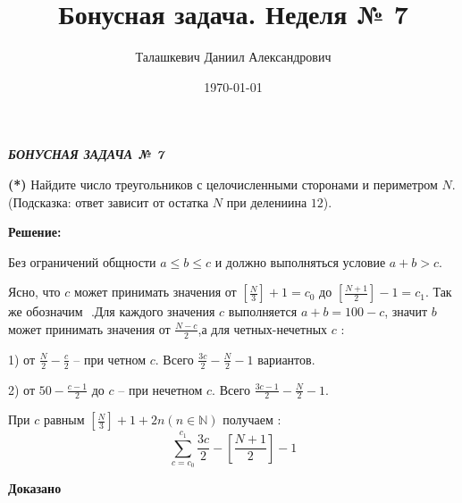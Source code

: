 \documentclass[a4paper,12pt]{article} %
\author{Талашкевич Даниил Александрович}
\title{Бонусная задача. Неделя № 7}
\date{\today}
\begin{document}
\maketitle
\thispagestyle{empty}

\newpage
\setcounter{page}{1}
\begin{center}
\itshape
\bfseries
{ \Large БОНУСНАЯ ЗАДАЧА № 	7}
\end{center}

{\bf (*) } Найдите число треугольников с целочисленными сторонами и периметром $N$. (Подсказка: ответ зависит от остатка $N$ при делениина $12$).
\begin{center}
\bfseries
{\Large Решение: }
\end{center}

Без ограничений общности $a\leqslant b \leqslant c$ и должно выполняться условие $a+b > c$.

Ясно, что $c$ может принимать значения от $\left[ \frac{N}{3}\right] + 1= c_0$ до $\left[ \frac{N+1}{2}\right]  - 1 = c_1$. Так же обозначим $ $ .Для каждого значения $c$ выполняется $a+b = 100 - c$, значит $b$ может принимать значения от $\frac{N - c}{2}$,а для четных-нечетных $c$ :

1) от $\frac{N}{2} - \frac{c}{2}$ -- при четном $c$. Всего $\frac{3c}{2} - \frac{N}{2} - 1$ вариантов.

2) от $50 - \frac{c-1}{2}$ до $c$ -- при нечетном $c$. Всего $\frac{3c-1}{2} - \frac{N}{2} - 1$.

При $c$ равным $\left[ \frac{N}{3}\right]  + 1 +2n(n \in \mathbb{N})$ получаем :
\[ \sum\limits_{c = c_0}^{c_1} \frac{3c}{2} - \left[ \frac{N+1}{2}\right]  - 1 \]


\begin{flushright}
\begin{large}
\textbf {Доказано }
\end{large}
\end{flushright}
\end{document}
